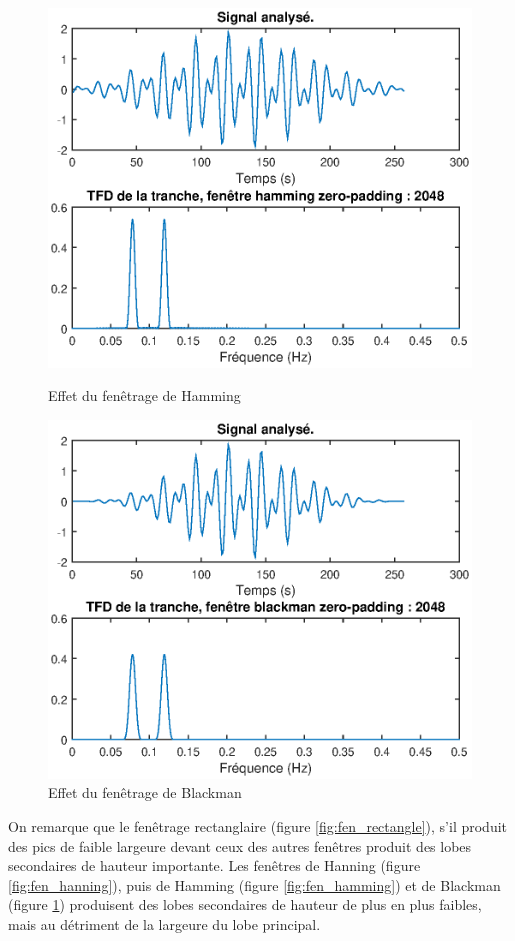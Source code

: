 \documentclass[french]{article}
\begin{document}
\begin{figure}[h!]
\begin{minipage}{0.45\textwidth}
  		\label{fig:fen_hanning}
	\end{minipage}
	\begin{minipage}{0.45\textwidth}
		\centering
		\includegraphics[width=\textwidth]{images/hamming.eps}
		\caption{Effet du fenêtrage de Hamming}
		\label{fig:fen_hamming}
	\end{minipage}
	\begin{minipage}{0.45\textwidth}
		\centering
		\includegraphics[width=\textwidth]{images/blackman.eps}
		\caption{Effet du fenêtrage de Blackman}
		\label{fig:fen_blackman}
	\end{minipage}
\end{figure}

On remarque que le fenêtrage rectanglaire (figure \ref{fig:fen_rectangle}), s'il produit des pics de faible largeure devant ceux des autres fenêtres produit des lobes secondaires de hauteur importante. Les fenêtres de Hanning (figure \ref{fig:fen_hanning}), puis de Hamming (figure \ref{fig:fen_hamming}) et de Blackman (figure \ref{fig:fen_blackman}) produisent des lobes secondaires de hauteur de plus en plus faibles, mais au détriment de la largeure du lobe principal.
\end{document}
